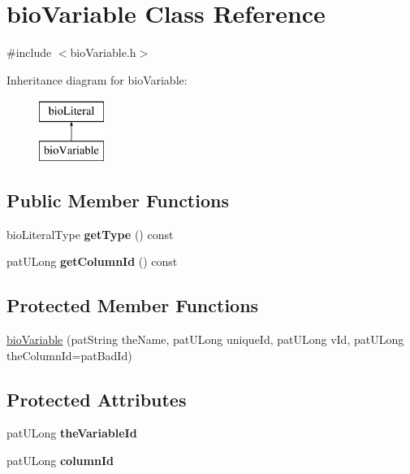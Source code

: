 \hypertarget{classbio_variable}{}\section{bio\+Variable Class Reference}
\label{classbio_variable}


{\ttfamily \#include $<$bio\+Variable.\+h$>$}

Inheritance diagram for bio\+Variable\+:\begin{figure}[H]
\begin{center}
\leavevmode
\includegraphics[height=2.000000cm]{classbio_variable}
\end{center}
\end{figure}
\subsection*{Public Member Functions}
\begin{DoxyCompactItemize}
\item 
\mbox{\label{classbio_variable_aa9c4bd0e7a32a39dc509174a03ac718a}} 
bio\+Literal\+Type {\bfseries get\+Type} () const
\item 
\mbox{\label{classbio_variable_a8536794d680f3e6dc6803c5e921b8a35}} 
pat\+U\+Long {\bfseries get\+Column\+Id} () const
\end{DoxyCompactItemize}
\subsection*{Protected Member Functions}
\begin{DoxyCompactItemize}
\item 
\hyperlink{classbio_variable_a9589f9c33ad274d73c88b60ae2524484}{bio\+Variable} (pat\+String the\+Name, pat\+U\+Long unique\+Id, pat\+U\+Long v\+Id, pat\+U\+Long the\+Column\+Id=pat\+Bad\+Id)
\end{DoxyCompactItemize}
\subsection*{Protected Attributes}
\begin{DoxyCompactItemize}
\item 
\mbox{\label{classbio_variable_ae9486108b22d60dd15203a634e245d86}} 
pat\+U\+Long {\bfseries the\+Variable\+Id}
\item 
\mbox{\label{classbio_variable_a3cba7760be6974b0f8c70059bb256f1e}} 
pat\+U\+Long {\bfseries column\+Id}
\end{DoxyCompactItemize}
